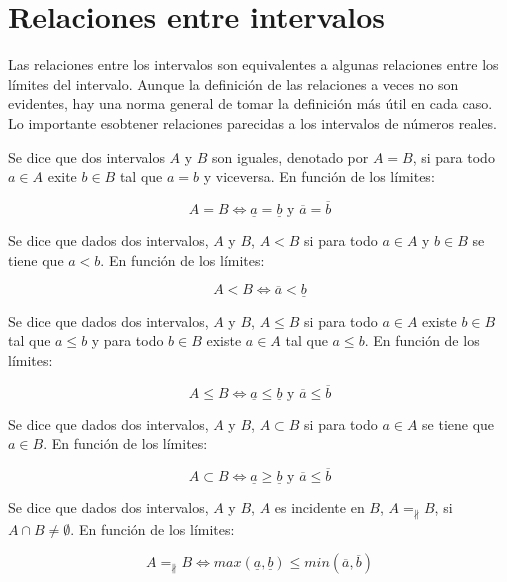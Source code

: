 \section{Relaciones entre intervalos}

Las relaciones entre los intervalos son equivalentes a algunas relaciones entre los límites del intervalo. Aunque la definición de las relaciones a veces no son evidentes, hay una norma general de tomar la definición más útil en cada caso. Lo importante esobtener relaciones parecidas a los intervalos de números reales.

\begin{definition}
Se dice que dos intervalos $A$ y $B$ son iguales, denotado por $A = B$, si para todo $a \in A$ exite $b \in B$ tal que $a = b$ y viceversa. En función de los límites:

$$A = B \iff \underline{a} = \underline{b} \text{ y } \overline{a} = \overline{b}$$
\end{definition}

\begin{definition}
Se dice que dados dos intervalos, $A$ y $B$, $A < B$ si para todo $a \in A$ y $b \in B$ se tiene que $a < b$. En función de los límites:

$$A < B \iff \overline{a} < \underline{b}$$
\end{definition}

\begin{definition}
Se dice que dados dos intervalos, $A$ y $B$, $A \leq B$ si para todo $a \in A$ existe $b \in B$ tal que $a \leq b$ y para todo $b \in B$ existe $a \in A$ tal que $a \leq b$. En función de los límites:

$$A \leq B \iff \underline{a} \leq \underline{b} \text{ y } \overline{a} \leq \overline{b}$$
\end{definition}

\begin{definition}
Se dice que dados dos intervalos, $A$ y $B$, $A \subset B$ si para todo $a \in A$ se tiene que $a \in B$. En función de los límites:

$$A \subset B \iff \underline{a} \geq \underline{b} \text{ y } \overline{a} \leq \overline{b}$$
\end{definition}

\begin{definition}
Se dice que dados dos intervalos, $A$ y $B$, $A$ es incidente en $B$, $A =_{\nparallel} B$, si $A \cap B \neq \emptyset$. En función de los límites:

$$A =_{\nparallel} B \iff max(\underline{a},\underline{b}) \leq min(\overline{a},\overline{b})$$
\end{definition}


